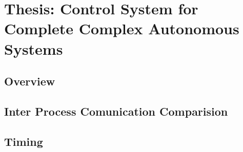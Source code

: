\chapter{Thesis: Control System for Complete Complex Autonomous Systems}\label{sec:hubo-ach}

\section{Overview}




\section{Inter Process Comunication Comparision}
	
\section{Timing}
	

